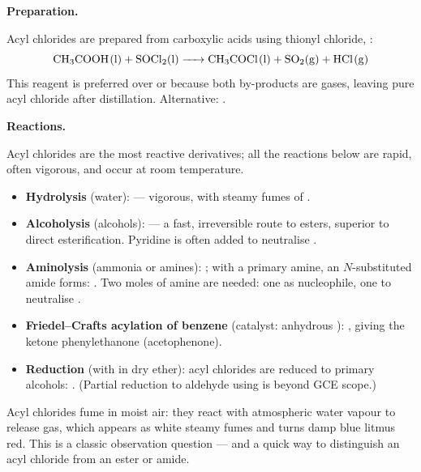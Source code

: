 \documentclass[11pt]{article}
\newcommand{\cle}[1]{{\popxbold\color{popdark}#1}}
\newcounter{popsec}
\newcounter{popsub}
\newcommand{\courssub}[1]{%
  \stepcounter{popsub}%
  \par\vspace{9pt}\noindent{\popxbold\fontsize{11.5}{13}\selectfont\color{popink}{\color{poporange}\thepopsec.\thepopsub}\hspace{6pt}#1}\par\nopagebreak\vspace{4pt}
}
\begin{document}
\textbf{Preparation.}\par
Acyl chlorides are prepared from carboxylic acids using \cle{thionyl chloride}, :
\[ \ce{CH3COOH(l) + SOCl2(l) -> CH3COCl(l) + SO2(g) + HCl(g)} \]
This reagent is preferred over  or  because both by-products are gases, leaving pure acyl chloride after distillation. Alternative: .

\textbf{Reactions.}\par
Acyl chlorides are the most reactive derivatives; all the reactions below are rapid, often vigorous, and occur at room temperature.

\begin{itemize}
\item \textbf{Hydrolysis} (water):  — vigorous, with steamy fumes of .
\item \textbf{Alcoholysis} (alcohols):  — a fast, irreversible route to esters, superior to direct esterification. Pyridine is often added to neutralise .
\item \textbf{Aminolysis} (ammonia or amines): ; with a primary amine, an $N$-substituted amide forms: . Two moles of amine are needed: one as nucleophile, one to neutralise .
\item \textbf{Friedel--Crafts acylation of benzene} (catalyst: anhydrous ): , giving the ketone phenylethanone (acetophenone).
\item \textbf{Reduction} (with  in dry ether): acyl chlorides are reduced to primary alcohols: . (Partial reduction to aldehyde using  is beyond GCE scope.)
\end{itemize}

\begin{attention}
Acyl chlorides \cle{fume in moist air}: they react with atmospheric water vapour to release  gas, which appears as white steamy fumes and turns damp blue litmus red. This is a classic observation question — and a quick way to distinguish an acyl chloride from an ester or amide.
\end{attention}

\courssub{Acid Anhydrides}
\end{document}
